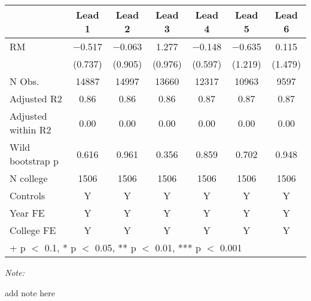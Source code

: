 \begin{table}
\centering
\begin{threeparttable}
\begin{tabular}[t]{lcccccc}
\toprule
  & Lead 1 & Lead 2 & Lead 3 & Lead 4 & Lead 5 & Lead 6\\
\midrule
RM & \num{-0.517} & \num{-0.063} & \num{1.277} & \num{-0.148} & \num{-0.635} & \num{0.115}\\
 & (\num{0.737}) & (\num{0.905}) & (\num{0.976}) & (\num{0.597}) & (\num{1.219}) & (\num{1.479})\\
\midrule
N Obs. & \num{14887} & \num{14997} & \num{13660} & \num{12317} & \num{10963} & \num{9597}\\
Adjusted R2 & \num{0.86} & \num{0.86} & \num{0.86} & \num{0.87} & \num{0.87} & \num{0.87}\\
Adjusted within R2 & \num{0.00} & \num{0.00} & \num{0.00} & \num{0.00} & \num{0.00} & \num{0.00}\\
Wild bootstrap p & 0.616 & 0.961 & 0.356 & 0.859 & 0.702 & 0.948\\
N college & 1506 & 1506 & 1506 & 1506 & 1506 & 1506\\
Controls & Y & Y & Y & Y & Y & Y\\
Year FE & Y & Y & Y & Y & Y & Y\\
College FE & Y & Y & Y & Y & Y & Y\\
\bottomrule
\multicolumn{7}{l}{\rule{0pt}{1em}+ p $<$ 0.1, * p $<$ 0.05, ** p $<$ 0.01, *** p $<$ 0.001}\\
\end{tabular}
\begin{tablenotes}
\item \textit{Note: } 
\item add note here
\end{tablenotes}
\end{threeparttable}
\end{table}

